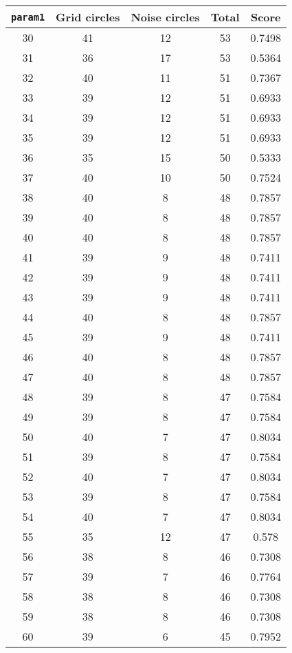 \documentclass[letterpaper, 12pt]{article}
\begin{document}
\begin{longtable}{|c|c|c|c|c|}
\hline
\textbf{\texttt{param1}} & \textbf{Grid circles} & \textbf{Noise circles} & \textbf{Total} & \textbf{Score} \\
\hline
30 & 41 & 12 & 53 & 0.7498 \\
\hline
31 & 36 & 17 & 53 & 0.5364 \\
\hline
32 & 40 & 11 & 51 & 0.7367 \\
\hline
33 & 39 & 12 & 51 & 0.6933 \\
\hline
34 & 39 & 12 & 51 & 0.6933 \\
\hline
35 & 39 & 12 & 51 & 0.6933 \\
\hline
36 & 35 & 15 & 50 & 0.5333 \\
\hline
37 & 40 & 10 & 50 & 0.7524 \\
\hline
38 & 40 & 8 & 48 & 0.7857 \\
\hline
39 & 40 & 8 & 48 & 0.7857 \\
\hline
40 & 40 & 8 & 48 & 0.7857 \\
\hline
41 & 39 & 9 & 48 & 0.7411 \\
\hline
42 & 39 & 9 & 48 & 0.7411 \\
\hline
43 & 39 & 9 & 48 & 0.7411 \\
\hline
44 & 40 & 8 & 48 & 0.7857 \\
\hline
45 & 39 & 9 & 48 & 0.7411 \\
\hline
46 & 40 & 8 & 48 & 0.7857 \\
\hline
47 & 40 & 8 & 48 & 0.7857 \\
\hline
48 & 39 & 8 & 47 & 0.7584 \\
\hline
49 & 39 & 8 & 47 & 0.7584 \\
\hline
50 & 40 & 7 & 47 & 0.8034 \\
\hline
51 & 39 & 8 & 47 & 0.7584 \\
\hline
52 & 40 & 7 & 47 & 0.8034 \\
\hline
53 & 39 & 8 & 47 & 0.7584 \\
\hline
54 & 40 & 7 & 47 & 0.8034 \\
\hline
55 & 35 & 12 & 47 & 0.578 \\
\hline
56 & 38 & 8 & 46 & 0.7308 \\
\hline
57 & 39 & 7 & 46 & 0.7764 \\
\hline
58 & 38 & 8 & 46 & 0.7308 \\
\hline
59 & 38 & 8 & 46 & 0.7308 \\
\hline
60 & 39 & 6 & 45 & 0.7952 \\
\hline

\end{longtable}
\end{document}
